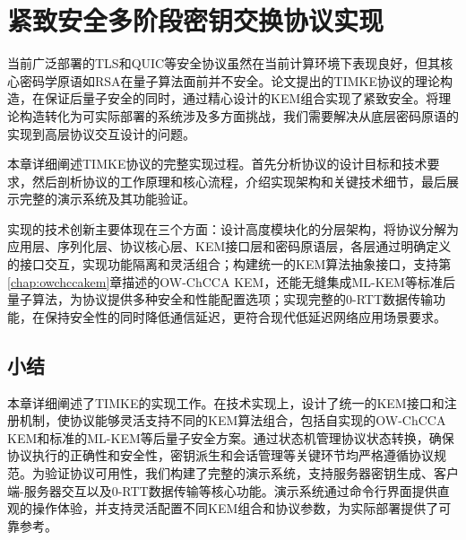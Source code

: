 \section{紧致安全多阶段密钥交换协议实现}

当前广泛部署的TLS和QUIC等安全协议虽然在当前计算环境下表现良好，但其核心密码学原语如RSA在量子算法面前并不安全。论文\cite{timke_2024}提出的TIMKE协议的理论构造，在保证后量子安全的同时，通过精心设计的KEM组合实现了紧致安全。将理论构造转化为可实际部署的系统涉及多方面挑战，我们需要解决从底层密码原语的实现到高层协议交互设计的问题。

本章详细阐述TIMKE协议的完整实现过程。首先分析协议的设计目标和技术要求，然后剖析协议的工作原理和核心流程，介绍实现架构和关键技术细节，最后展示完整的演示系统及其功能验证。

实现的技术创新主要体现在三个方面：设计高度模块化的分层架构，将协议分解为应用层、序列化层、协议核心层、KEM接口层和密码原语层，各层通过明确定义的接口交互，实现功能隔离和灵活组合；构建统一的KEM算法抽象接口，支持第\ref{chap:owchccakem}章描述的OW-ChCCA KEM，还能无缝集成ML-KEM等标准后量子算法，为协议提供多种安全和性能配置选项；实现完整的0-RTT数据传输功能，在保持安全性的同时降低通信延迟，更符合现代低延迟网络应用场景要求。






\subsection{小结}

本章详细阐述了TIMKE的实现工作。在技术实现上，设计了统一的KEM接口和注册机制，使协议能够灵活支持不同的KEM算法组合，包括自实现的OW-ChCCA KEM和标准的ML-KEM等后量子安全方案。通过状态机管理协议状态转换，确保协议执行的正确性和安全性，密钥派生和会话管理等关键环节均严格遵循协议规范。为验证协议可用性，我们构建了完整的演示系统，支持服务器密钥生成、客户端-服务器交互以及0-RTT数据传输等核心功能。演示系统通过命令行界面提供直观的操作体验，并支持灵活配置不同KEM组合和协议参数，为实际部署提供了可靠参考。

